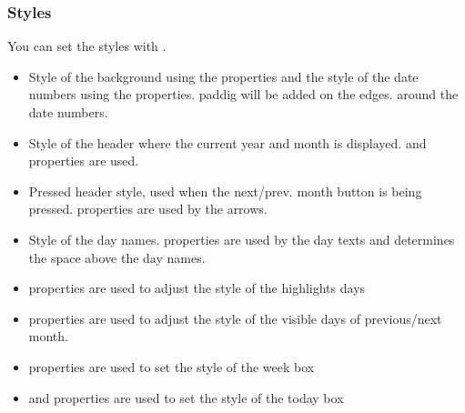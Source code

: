 \documentclass[letterpaper,10pt,english]{sphinxmanual}
\begin{document}
\subsubsection{Styles}
\label{\detokenize{object-types/calendar:styles}}
You can set the styles with .
\begin{itemize}
\item {} 
 Style of the background using the  properties and the style of the date numbers using the  properties.  paddig will be added on the edges. around the date numbers.

\item {} 
 Style of the header where the current year and month is displayed.  and  properties are used.

\item {} 
 Pressed header style, used when the next/prev. month button is being pressed.  properties are used by the arrows.

\item {} 
 Style of the day names.  properties are used by the day texts and  determines the space above the day names.

\item {} 
  properties are used to adjust the style of the highlights days

\item {} 
  properties are used to adjust the style of the visible days of previous/next month.

\item {} 
  properties are used to set the style of the week box

\item {} 
  and  properties are used to set the style of the today box

\end{itemize}
\end{document}
